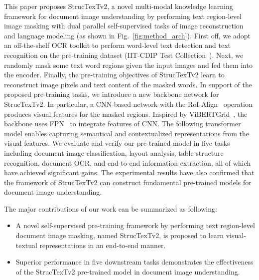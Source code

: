 \documentclass{article} %
\begin{document}
This paper proposes StrucTexTv2, a novel multi-modal knowledge learning framework for document image understanding by performing text region-level image masking with dual parallel self-supervised tasks of image reconstruction and language modeling (as shown in Fig.~\ref{fig:method_arch}). First off, we adopt an off-the-shelf OCR toolkit to perform word-level text detection and text recognition on the pre-training dataset (IIT-CDIP Test Collection~\cite{sigir06cdip}). Next, we randomly mask some text word regions given the input images and fed them into the encoder. Finally, the pre-training objectives of StrucTexTv2 learn to reconstruct image pixels and text content of the masked words. In support of the proposed pre-training tasks, we introduce a new backbone network for StrucTexTv2. In particular, a CNN-based network with the RoI-Align~\cite{he2017mask} operation produces visual features for the masked regions. Inspired by ViBERTGrid~\cite{lin2021vibertgrid}, the backbone uses FPN~\cite{lin2017feature} to integrate features of CNN. The following transformer model enables capturing semantical and contextualized representations from the visual features. We evaluate and verify our pre-trained model in five tasks including document image classification, layout analysis, table structure recognition, document OCR, and end-to-end information extraction, all of which have achieved significant gains. The experimental results have also confirmed that the framework of StrucTexTv2 can construct fundamental pre-trained models for document image understanding.

The major contributions of our work can be summarized as following:
\begin{itemize}
 \item A novel self-supervised pre-training framework by performing text region-level document image masking, named StrucTexTv2, is proposed to learn visual-textual representations in an end-to-end manner.
 
 \item Superior performance in five downstream tasks demonstrates the effectiveness of the StrucTexTv2 pre-trained model in document image understanding.
\end{itemize}
\end{document}
